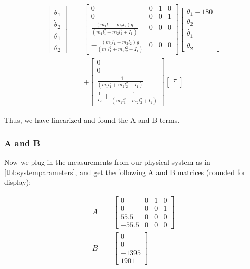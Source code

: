 \documentclass[conference]{IEEEtran}
\begin{document}
\begin{align}
    \begin{bmatrix}
        \dot\theta_1 \\
        \dot\theta_2 \\
        \ddot\theta_1 \\
        \ddot\theta_2
    \end{bmatrix}
    =&
    \begin{bmatrix}
        0 & 0 & 1 & 0 \\
        0 & 0 & 0 & 1 \\
        \frac{(m_1 l_1 + m_2 l_2) g}{(m_1 l_1^2 + m_2 l_2^2 + I_1)} & 0 & 0 & 0 \\
        - \frac{(m_1 l_1 + m_2 l_2) g}{(m_1 l_1^2 + m_2 l_2^2 + I_1)}  & 0 & 0 & 0
    \end{bmatrix}
    \begin{bmatrix}
        \theta_1 - 180 \\
        \theta_2 \\
        \dot{\theta_1} \\
        \dot{\theta_2}
    \end{bmatrix} \nonumber \\
    &+
    \begin{bmatrix}
        0 \\
        0 \\
        \frac{-1}{(m_1 l_1^2 + m_2 l_2^2 + I_1)} \\
        \frac{1}{I_2} + \frac{1}{(m_1 l_1^2 + m_2 l_2^2 + I_1)}
    \end{bmatrix}
    \begin{bmatrix}
        \tau \\
    \end{bmatrix}
\end{align}

Thus, we have linearized and found the A and B terms.

\subsubsection{A and B}

Now we plug in the measurements from our physical system as in
\cref{tbl:systemparameters}, and get the following A and B matrices (rounded for
display):

\begin{align}
    A &= 
    \begin{bmatrix}
        0 & 0 & 1 & 0 \\
        0 & 0 & 0 & 1 \\
        55.5 & 0 & 0 & 0 \\
        -55.5 & 0 & 0 & 0
    \end{bmatrix} \\
    B &=  
    \begin{bmatrix}
        0 \\
        0 \\
        -1395\\
        1901
    \end{bmatrix}
\end{align}
\end{document}
